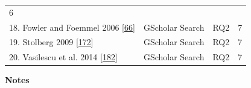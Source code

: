 \documentclass[]{book}
\begin{document}
\begin{longtable}[]{@{}llll@{}}
\begin{minipage}[t]{0.06\columnwidth}
6\strut
\end{minipage}\tabularnewline
\begin{minipage}[t]{0.48\columnwidth}\raggedright\strut
18. Fowler and Foemmel 2006
{[}\protect\hyperlink{ref-fowler2006continuous}{66}{]}\strut
\end{minipage} & \begin{minipage}[t]{0.20\columnwidth}\raggedright\strut
GScholar Search\strut
\end{minipage} & \begin{minipage}[t]{0.14\columnwidth}\raggedright\strut
RQ2\strut
\end{minipage} & \begin{minipage}[t]{0.06\columnwidth}\raggedright\strut
7\strut
\end{minipage}\tabularnewline
\begin{minipage}[t]{0.48\columnwidth}\raggedright\strut
19. Stolberg 2009
{[}\protect\hyperlink{ref-stolberg2009enabling}{172}{]}\strut
\end{minipage} & \begin{minipage}[t]{0.20\columnwidth}\raggedright\strut
GScholar Search\strut
\end{minipage} & \begin{minipage}[t]{0.14\columnwidth}\raggedright\strut
RQ2\strut
\end{minipage} & \begin{minipage}[t]{0.06\columnwidth}\raggedright\strut
7\strut
\end{minipage}\tabularnewline
\begin{minipage}[t]{0.48\columnwidth}\raggedright\strut
20. Vasilescu et al. 2014
{[}\protect\hyperlink{ref-vasilescu2014continuous}{182}{]}\strut
\end{minipage} & \begin{minipage}[t]{0.20\columnwidth}\raggedright\strut
GScholar Search\strut
\end{minipage} & \begin{minipage}[t]{0.14\columnwidth}\raggedright\strut
RQ2\strut
\end{minipage} & \begin{minipage}[t]{0.06\columnwidth}\raggedright\strut
7\strut
\end{minipage}\tabularnewline
\bottomrule
\end{longtable}

\textbf{Notes}
\end{document}
